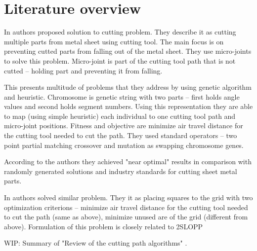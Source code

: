 \chapter{Literature overview}\label{ch:literature-overview}

In \cite{kandasamyEffectiveLocationMicro2020} authors proposed solution to cutting problem.
They describe it as cutting multiple parts from metal sheet using cutting tool.
The main focus is on preventing cutted parts from falling out of the metal sheet.
They use micro-joints to solve this problem. Micro-joint is part of the cutting tool
path that is not cutted – holding part and preventing it from falling.

This presents multitude of problems that they address by using genetic algorithm
and heuristic. Chromosome is genetic string with two parts – first holds
angle values and second holds segment numbers. Using this representation they are able
to map (using simple heuristic) each individual to one cutting tool path and micro-joint positions.
Fitness and objective are minimize air travel distance for the cutting tool needed to cut the
path. They used standard operators – two point partial matching crossover and mutation
as swapping chromosome genes.

According to the authors they achieved "near optimal" results in comparison with randomly
generated solutions and industry standards for cutting sheet metal parts.

In \cite{vijayanandHeuristicGeneticApproach2015} authors solved similar problem. They it
as placing squares to the grid with two optimization criterions – minimize air travel distance
for the cutting tool needed to cut the path (same as above), minimize unused are of the grid (different from above).
Formulation of this problem is closely related to 2SLOPP\footnotemark

WIP: Summary of "Review of the cutting path algorithms" \cite{dewilReviewCuttingPath2016}.


